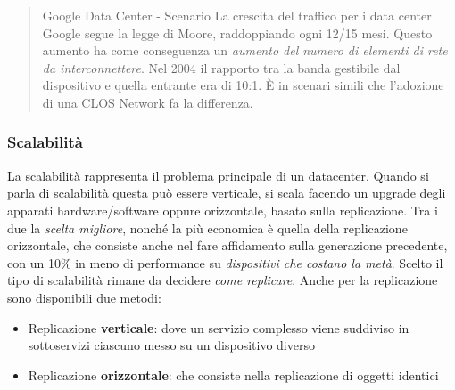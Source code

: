 \documentclass{article}
\providecommand{\tightlist}{%
		  \setlength{\itemsep}{0pt}\setlength{\parskip}{0pt}}
\begin{document}
		\begin{quote}
		Google Data Center - Scenario La crescita del traffico per i
		data center Google segue la legge di Moore, raddoppiando ogni
		12/15 mesi. Questo aumento ha come conseguenza un \emph{aumento del
		numero di elementi di rete da interconnettere}. Nel 2004 il rapporto tra
		la banda gestibile dal dispositivo e quella entrante era di 10:1.
		È in scenari simili che l'adozione di una CLOS Network fa la
		differenza.
		\end{quote}
		
		\subsubsection{Scalabilità}\label{scalabilituxe0}
		
		La scalabilità rappresenta il problema principale
		di un datacenter. Quando si parla di scalabilità questa può essere
		verticale, si scala facendo un upgrade degli
		apparati hardware/software oppure orizzontale,
		basato sulla replicazione. Tra i due la \emph{scelta
		migliore}, nonché la più economica è quella della
		replicazione orizzontale, che consiste anche nel
		fare affidamento sulla generazione precedente, con un
		10\% in meno di performance su \emph{dispositivi che costano la
		metà}. Scelto il tipo di scalabilità rimane da decidere \emph{come
		replicare}. Anche per la replicazione sono disponibili
		due metodi:
		
		\begin{itemize}
		\tightlist
		\item
		  Replicazione \textbf{verticale}: dove un servizio complesso
		  viene suddiviso in sottoservizi ciascuno messo su un
		  dispositivo diverso
		\item
		  Replicazione \textbf{orizzontale}: che consiste nella
		  replicazione di oggetti identici
		\end{itemize}
		
\end{document}
